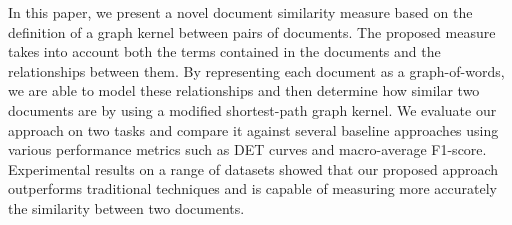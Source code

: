 In this paper, we present a novel document similarity measure based on the definition of a graph kernel between pairs of documents. The proposed measure takes into account both the terms contained in the documents and the relationships between them. By representing each document as a graph-of-words, we are able to model these relationships and then determine how similar two documents are by using a modified shortest-path graph kernel. We evaluate our approach on two tasks and compare it against several baseline approaches using various performance metrics such as DET curves and macro-average F1-score. Experimental results on a range of datasets showed that our proposed approach outperforms traditional techniques and is capable of measuring more accurately the similarity between two documents.
